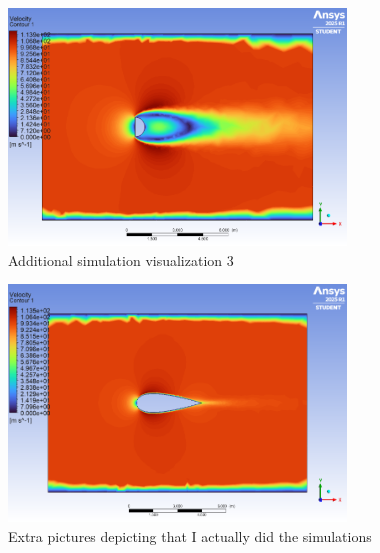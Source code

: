 \documentclass[12pt,a4paper]{article}
\begin{document}
\begin{figure}[H]
\centering
\includegraphics[width=0.8\textwidth]{image16.png}
\caption{Additional simulation visualization 3}
\label{fig:asset3}
\end{figure}

\begin{figure}[H]
\centering
\includegraphics[width=0.8\textwidth]{image13.png}
\caption{Extra pictures depicting that I actually did the simulations}
\label{fig:asset4}
\end{figure}
\end{document}
